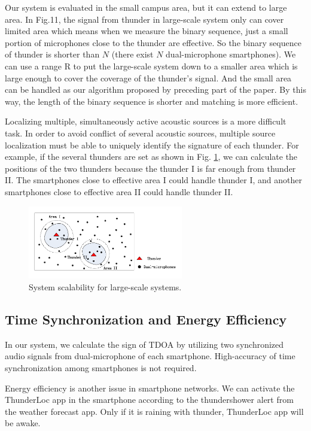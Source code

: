 Our system is evaluated in the small campus area, but it can extend to large area. 
In Fig.11, the signal from thunder in large-scale system only can cover limited area which means when we measure the binary sequence, 
 just a small portion of microphones close to the thunder are effective. 
So the binary sequence of thunder is shorter than $N$ (there exist $N$ dual-microphone smartphones). 
We can use a range R to put the large-scale system down to a smaller area which is large enough to cover the coverage of the thunder's signal. 
And the small area can be handled as our algorithm proposed by preceding part of the paper. 
By this way, the length of the binary sequence is shorter and matching is more efficient.


Localizing multiple, simultaneously active acoustic sources is a more difficult task. 
In order to avoid conflict of several acoustic sources, 
multiple source localization must be able to uniquely identify the signature of each thunder. 
For example, if the several thunders are set as shown in Fig. \ref{multiple_source_localization},
we can calculate the positions of the two thunders because the thunder I is far enough from thunder II. 
The smartphones close to effective area I could handle thunder I, and another smartphones close to effective area II could handle thunder II. 
  \vspace{-8mm}
  \begin{figure}[ht]
            \setlength{\abovecaptionskip}{0pt}
            \centering
            \includegraphics[scale=1.2,height=3.2cm]{fig/msl.pdf}
             \vspace{1mm}
			\caption{\label{Fig9:} System scalability for large-scale systems.}
            \label{multiple_source_localization}
            \vspace{-1mm}
  \end{figure}

 \vspace{-8mm}
 
\subsection{Time Synchronization and Energy Efficiency}
In our system, we calculate the sign of TDOA by utilizing two synchronized audio signals from dual-microphone of each smartphone. 
High-accuracy of time synchronization among smartphones is not required.

Energy efficiency is another issue in smartphone networks.
We can activate the ThunderLoc app in the smartphone according to the thundershower alert from the weather forecast app.
Only if it is raining with thunder, ThunderLoc app will be awake.






